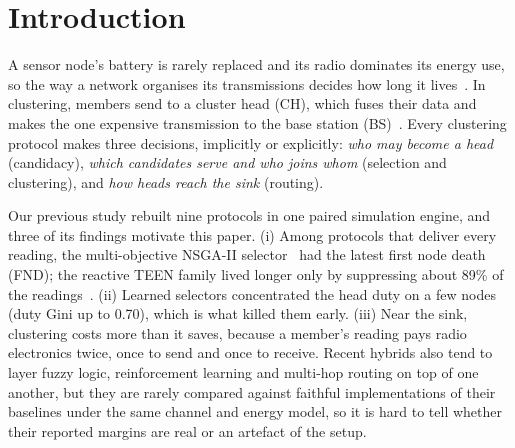 \section{Introduction}
A sensor node's battery is rarely replaced and its radio dominates its energy use, so the way a network organises its transmissions decides how long it lives~\cite{heinzelman2002leachc}. In clustering, members send to a cluster head (CH), which fuses their data and makes the one expensive transmission to the base station (BS)~\cite{heinzelman2000leach}. Every clustering protocol makes three decisions, implicitly or explicitly: \emph{who may become a head} (candidacy), \emph{which candidates serve and who joins whom} (selection and clustering), and \emph{how heads reach the sink} (routing).

Our previous study rebuilt nine protocols in one paired simulation engine, and three of its findings motivate this paper. (i) Among protocols that deliver every reading, the multi-objective NSGA-II selector~\cite{deb2002nsga2} had the latest first node death (FND); the reactive TEEN family lived longer only by suppressing about 89\% of the readings~\cite{manjeshwar2001teen}. (ii) Learned selectors concentrated the head duty on a few nodes (duty Gini up to 0.70), which is what killed them early. (iii) Near the sink, clustering costs more than it saves, because a member's reading pays radio electronics twice, once to send and once to receive. Recent hybrids also tend to layer fuzzy logic, reinforcement learning and multi-hop routing on top of one another, but they are rarely compared against faithful implementations of their baselines under the same channel and energy model, so it is hard to tell whether their reported margins are real or an artefact of the setup.

